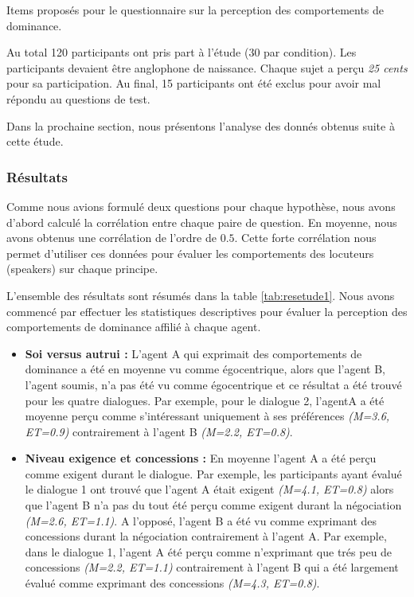 {\begin{table}[h]
							\caption{Items proposés pour le questionnaire sur la perception des comportements de dominance.}
							\label{table:questionnaire}
						\end{table}
					
					Au total 120 participants ont pris part à l'étude (30 par condition). Les participants devaient être anglophone de naissance. Chaque sujet a perçu \textit{25 cents} pour sa participation. Au final, 15 participants ont été exclus pour avoir mal répondu au questions de test. 
					
					Dans la prochaine section, nous présentons l'analyse des donnés obtenus suite à cette étude.
					
					
			\subsubsection{Résultats}
				Comme nous avions formulé deux questions pour chaque hypothèse, nous avons d'abord calculé la corrélation entre chaque paire de question. En moyenne, nous avons obtenus une corrélation de l'ordre de $0.5$. Cette forte corrélation nous permet d'utiliser ces données pour évaluer les comportements des locuteurs (speakers) sur chaque principe. 
				
				L'ensemble des résultats sont résumés dans la table \ref{tab:resetude1}. Nous avons commencé par effectuer les statistiques descriptives pour évaluer la perception des comportements de dominance affilié à chaque agent. 
					\begin{itemize}
							\item \textbf{Soi versus autrui :} L'agent A qui exprimait des comportements de dominance a été en moyenne vu comme égocentrique, alors que l'agent B, l'agent soumis, n'a pas été vu comme égocentrique et ce résultat a été trouvé pour les quatre dialogues.
							Par exemple, pour le dialogue 2, l'agentA a été moyenne perçu comme s'intéressant uniquement à ses préférences \textit{(M=3.6, ET=0.9)} contrairement à l'agent B \textit{(M=2.2, ET=0.8)}.
							
							\item \textbf{Niveau exigence et concessions :} En moyenne l'agent A a été perçu comme exigent durant le dialogue. Par exemple, les participants ayant évalué le dialogue 1 ont trouvé que l'agent A était exigent \textit{(M=4.1, ET=0.8)} alors que l'agent B n'a pas du tout été perçu comme exigent durant la négociation \textit{(M=2.6, ET=1.1)}. A l'opposé, l'agent B a été vu comme exprimant des concessions durant la négociation contrairement à l'agent A. Par exemple, dans le dialogue 1, l'agent A été perçu comme n'exprimant que trés peu de concessions \textit{(M=2.2, ET=1.1)} contrairement à l'agent B qui a été largement évalué comme exprimant des concessions \textit{(M=4.3, ET=0.8)}.
							

\end{itemize}}
